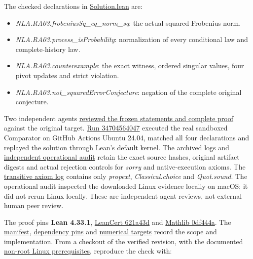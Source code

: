 \documentclass[11pt,a4paper]{article}
\providecommand{\tightlist}{\setlength{\itemsep}{0pt}\setlength{\parskip}{0pt}}
\begin{document}
The checked declarations in
\href{https://github.com/sgstepaniants/OpenProblemsInNLA/blob/973f95969701601dcae7b30683b175843baa9c22/randomized-and-low-rank-approximation/RA-03/lean/Solution.lean}{Solution.lean}
are:

\begin{itemize}
\tightlist
\item
  \textit{NLA.RA03.frobeniusSq\_eq\_norm\_sq}: the actual squared
  Frobenius norm.
\item
  \textit{NLA.RA03.process\_isProbability}: normalization of every
  conditional law and complete-history law.
\item
  \textit{NLA.RA03.counterexample}: the exact witness, ordered singular
  values, four pivot updates and strict violation.
\item
  \textit{NLA.RA03.not\_squaredErrorConjecture}: negation of the
  complete original conjecture.
\end{itemize}

Two independent agents
\href{https://github.com/ajt60gaibb/OpenProblemsInNLA/blob/main/randomized-and-low-rank-approximation/RA-03/lean/reviews}{reviewed
the frozen statements and complete proof} against the original target.
\href{https://github.com/sgstepaniants/OpenProblemsInNLA/actions/runs/34704564047}{Run
34704564047} executed the real sandboxed Comparator on GitHub Actions
Ubuntu 24.04, matched all four declarations and replayed the solution
through Lean's default kernel. The
\href{https://github.com/ajt60gaibb/OpenProblemsInNLA/blob/main/randomized-and-low-rank-approximation/RA-03/lean/verification/linux-2026-09-12}{archived
logs and independent operational audit} retain the exact source hashes,
original artifact digests and actual rejection controls for
\textit{sorry} and native-execution axioms. The
\href{https://github.com/ajt60gaibb/OpenProblemsInNLA/blob/main/randomized-and-low-rank-approximation/RA-03/lean/reviews/proof-referee-2-evidence/axioms.log}{transitive
axiom log} contains only \textit{propext}, \textit{Classical.choice} and
\textit{Quot.sound}. The operational audit inspected the downloaded
Linux evidence locally on macOS; it did not rerun Linux locally. These
are independent agent reviews, not external human peer review.

The proof pins \textbf{Lean 4.33.1},
\href{https://github.com/alerad/leancert/tree/621a43d7cf21f87872392a01e874f2f1dbddc926}{LeanCert
621a43d} and
\href{https://github.com/leanprover-community/mathlib4/tree/0df444a360eaa60ab8c11dca51a86af692955474}{Mathlib
0df444a}. The
\href{https://github.com/ajt60gaibb/OpenProblemsInNLA/blob/main/randomized-and-low-rank-approximation/RA-03/lean/formalization.yaml}{manifest},
\href{https://github.com/ajt60gaibb/OpenProblemsInNLA/blob/main/randomized-and-low-rank-approximation/RA-03/lean/lake-manifest.json}{dependency
pins} and
\href{https://github.com/ajt60gaibb/OpenProblemsInNLA/blob/main/randomized-and-low-rank-approximation/RA-03/lean/NUMERICAL_TARGETS.md}{numerical
targets} record the scope and implementation. From a checkout of the
verified revision, with the documented
\href{https://github.com/ajt60gaibb/OpenProblemsInNLA/blob/main/tools/lean/HARNESS.md}{non-root
Linux prerequisites}, reproduce the check with:
\end{document}
